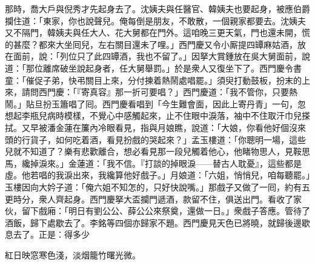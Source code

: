 那時，喬大戶與倪秀才先起身去了。沈姨夫與任醫官、韓姨夫也要起身，被應伯爵攔住道：「東家，你也說聲兒。俺每倒是朋友，不敢散，一個親家都要去。沈姨夫又不隔門，韓姨夫與任大人、花大舅都在門外。這咱晚三更天氣，門也還未開，慌的甚麼？{}都來大坐囘兒，左右關目還未了哩。」西門慶又令小厮提四罈麻姑酒，放在面前，說：「列位只了此四罈酒，我也不留了。」因拏大賞鍾放在吳大舅面前，說道：「那位離席破坐說起身者，任大舅舉罰。」於是衆人又復坐下了。西門慶令書童：「催促子弟，快弔關目上來，分付揀着熱鬧處唱罷。」須臾打動鼓板，扮末的上來，請問西門慶：「『寄真容』那一折可要唱？」西門慶道：「我不管你，只要熱鬧。」貼旦扮玉簫唱了囘。西門慶看唱到「今生難會面，因此上寄丹青」一句，忽想起李瓶兒病時模樣，不覺心中感觸起來，止不住眼中淚落，袖中不住取汗巾兒搽拭。{}又早被潘金蓮在簾內冷眼看見，{}指與月娘瞧，說道：「大娘，你看他好個沒來頭的行貨子，如何吃着酒，看見扮戲的哭起來？」孟玉樓道：「你聰明一場，這些兒就不知道了？樂有悲歡離合，想必看見那一段兒觸着他心，他睹物思人，見鞍思馬，纔掉淚來。」金蓮道：「我不信。『打談的掉眼淚——替古人耽憂』，這些都是虛。他若唱的我淚出來，我纔算他好戲子。」{}月娘道：「六姐，悄悄兒，咱每聽罷。」玉樓因向大妗子道：「俺六姐不知怎的，只好快說嘴。」那戲子又做了一囘，約有五更時分，衆人齊起身。西門慶拏大盃攔門遞酒，款留不住，俱送出門。看收了家伙，留下戲廂：「明日有劉公公、薛公公來祭奠，還做一日。」衆戲子答應。管待了酒飯，歸下處歇去了。李銘等四個亦歸家不題。西門慶見天色已將曉，就歸後邊歇息去了。正是：得多少

紅日映窓寒色淺，淡烟籠竹曙光微。

